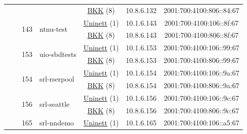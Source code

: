 \begin{small}
\begin{center}
\begin{longtable}{|c|c|c|c|c|c|c|c|}
  &  &  &  & \multicolumn{2}{|c|}{\tiny{\href{http://bkk.no}{BKK} (8)}} & \tiny{10.8.6.132} & \tiny{2001:700:4100:806::84:67} \\* \cline{3-3}\cline{4-4}\cline{5-5}\cline{6-6}\cline{7-7}\cline{8-8}
  &  & \multirow{2}{*}{\tiny{143}} & \multicolumn{1}{|l|}{\multirow{2}{*}{\tiny{ntnu-test}}} & \multicolumn{2}{|c|}{\tiny{\href{https://www.uninett.no}{Uninett} (1)}} & \tiny{10.1.6.143} & \tiny{2001:700:4100:106::8f:67} \\* \cline{5-5}\cline{6-6}\cline{7-7}\cline{8-8}
  &  &  &  & \multicolumn{2}{|c|}{\tiny{\href{http://bkk.no}{BKK} (8)}} & \tiny{10.8.6.143} & \tiny{2001:700:4100:806::8f:67} \\* \cline{3-3}\cline{4-4}\cline{5-5}\cline{6-6}\cline{7-7}\cline{8-8}
  &  & \multirow{2}{*}{\tiny{153}} & \multicolumn{1}{|l|}{\multirow{2}{*}{\tiny{uio-sbdtests}}} & \multicolumn{2}{|c|}{\tiny{\href{https://www.uninett.no}{Uninett} (1)}} & \tiny{10.1.6.153} & \tiny{2001:700:4100:106::99:67} \\* \cline{5-5}\cline{6-6}\cline{7-7}\cline{8-8}
  &  &  &  & \multicolumn{2}{|c|}{\tiny{\href{http://bkk.no}{BKK} (8)}} & \tiny{10.8.6.153} & \tiny{2001:700:4100:806::99:67} \\* \cline{3-3}\cline{4-4}\cline{5-5}\cline{6-6}\cline{7-7}\cline{8-8}
  &  & \multirow{2}{*}{\tiny{154}} & \multicolumn{1}{|l|}{\multirow{2}{*}{\tiny{srl-rserpool}}} & \multicolumn{2}{|c|}{\tiny{\href{https://www.uninett.no}{Uninett} (1)}} & \tiny{10.1.6.154} & \tiny{2001:700:4100:106::9a:67} \\* \cline{5-5}\cline{6-6}\cline{7-7}\cline{8-8}
  &  &  &  & \multicolumn{2}{|c|}{\tiny{\href{http://bkk.no}{BKK} (8)}} & \tiny{10.8.6.154} & \tiny{2001:700:4100:806::9a:67} \\* \cline{3-3}\cline{4-4}\cline{5-5}\cline{6-6}\cline{7-7}\cline{8-8}
  &  & \multirow{2}{*}{\tiny{156}} & \multicolumn{1}{|l|}{\multirow{2}{*}{\tiny{srl-seattle}}} & \multicolumn{2}{|c|}{\tiny{\href{https://www.uninett.no}{Uninett} (1)}} & \tiny{10.1.6.156} & \tiny{2001:700:4100:106::9c:67} \\* \cline{5-5}\cline{6-6}\cline{7-7}\cline{8-8}
  &  &  &  & \multicolumn{2}{|c|}{\tiny{\href{http://bkk.no}{BKK} (8)}} & \tiny{10.8.6.156} & \tiny{2001:700:4100:806::9c:67} \\* \cline{3-3}\cline{4-4}\cline{5-5}\cline{6-6}\cline{7-7}\cline{8-8}
  &  & \multirow{2}{*}{\tiny{165}} & \multicolumn{1}{|l|}{\multirow{2}{*}{\tiny{srl-nndemo}}} & \multicolumn{2}{|c|}{\tiny{\href{https://www.uninett.no}{Uninett} (1)}} & \tiny{10.1.6.165} & \tiny{2001:700:4100:106::a5:67} \\* \cline{5-5}\cline{6-6}\cline{7-7}\cline{8-8}

\end{longtable}
\end{center}
\end{small}
